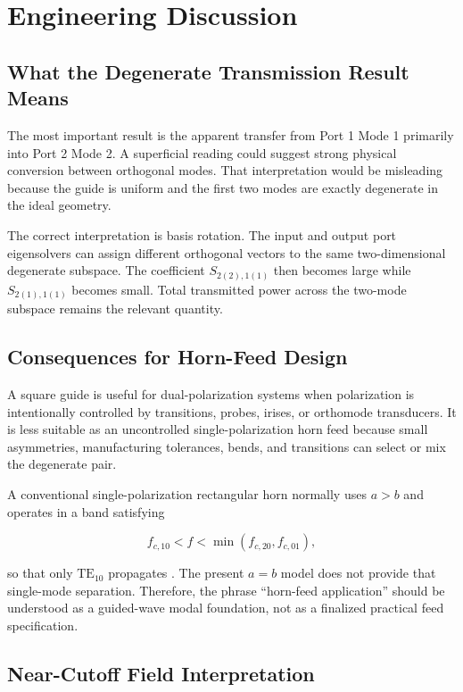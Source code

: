 \section{Engineering Discussion}
\label{sec:engineering-discussion}

\subsection{What the Degenerate Transmission Result Means}

The most important result is the apparent transfer from Port 1 Mode 1 primarily into Port 2 Mode 2. A superficial reading could suggest strong physical conversion between orthogonal modes. That interpretation would be misleading because the guide is uniform and the first two modes are exactly degenerate in the ideal geometry.

The correct interpretation is basis rotation. The input and output port eigensolvers can assign different orthogonal vectors to the same two-dimensional degenerate subspace. The coefficient \(S_{2(2),1(1)}\) then becomes large while \(S_{2(1),1(1)}\) becomes small. Total transmitted power across the two-mode subspace remains the relevant quantity.

\subsection{Consequences for Horn-Feed Design}

A square guide is useful for dual-polarization systems when polarization is intentionally controlled by transitions, probes, irises, or orthomode transducers. It is less suitable as an uncontrolled single-polarization horn feed because small asymmetries, manufacturing tolerances, bends, and transitions can select or mix the degenerate pair.

A conventional single-polarization rectangular horn normally uses \(a>b\) and operates in a band satisfying

\[
f_{c,10}<f<\min(f_{c,20},f_{c,01}),
\]

so that only \(\mathrm{TE}_{10}\) propagates \cite{pozar2011microwave,stutzman2013antenna}. The present \(a=b\) model does not provide that single-mode separation. Therefore, the phrase ``horn-feed application'' should be understood as a guided-wave modal foundation, not as a finalized practical feed specification.

\subsection{Near-Cutoff Field Interpretation}

